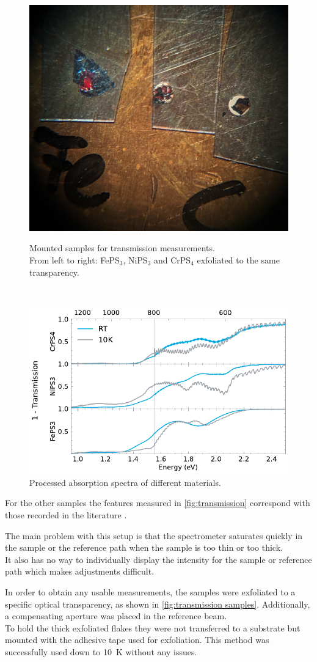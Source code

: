 \documentclass[
	twoside,
	parskip=half,
	a4paper,
]{scrbook}
\begin{document}
\begin{figure}
	\includegraphics[width=.3\textwidth]{../../photos/transmission samples.jpg}
	\caption\\
	{Mounted samples for transmission measurements.\\
	From left to right: FePS$_3$, NiPS$_3$ and CrPS$_4$ exfoliated to the same transparency.}
	\label{fig:transmission samples}
\end{figure}
\begin{figure}[b]
	\centering
	\includegraphics{../figures/2024-03-15 Absorbance.pdf}
	\caption{Processed absorption spectra of different materials.}
	\label{fig:transmission}
\end{figure}
For the other samples the features measured in \autoref{fig:transmission} correspond with those recorded in the literature \cite{CrPS4_transmission, NiPS3_transmission, FePS3_transmission}.

The main problem with this setup is that the spectrometer saturates quickly in the sample or the reference path when the sample is too thin or too thick.\\
It also has no way to individually display the intensity for the sample or reference path which makes adjustments difficult.

In order to obtain any usable measurements, the samples were exfoliated to a specific optical transparency, as shown in \autoref{fig:transmission samples}.
Additionally, a compensating aperture was placed in the reference beam.\\
To hold the thick exfoliated flakes they were not transferred to a substrate but mounted with the adhesive tape used for exfoliation. 
This method was successfully used down to \SI{10}{K} without any issues.
\end{document}
